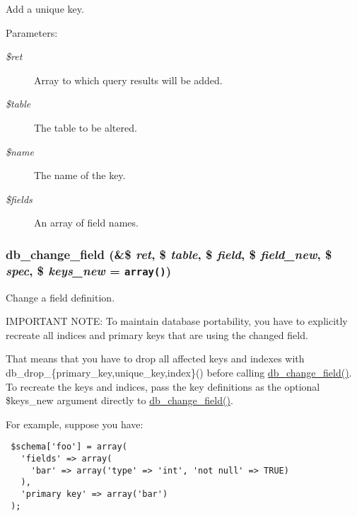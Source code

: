 Add a unique key.

\begin{Desc}
\item[Parameters:]
\begin{description}
\item[{\em \$ret}]Array to which query results will be added. \item[{\em \$table}]The table to be altered. \item[{\em \$name}]The name of the key. \item[{\em \$fields}]An array of field names. \end{description}
\end{Desc}
\hypertarget{group__schemaapi_g03f152245358d2db68d067aa8a1fceb4}{
\subsubsection[{db\_\-change\_\-field}]{\setlength{\rightskip}{0pt plus 5cm}db\_\-change\_\-field (\&\$ {\em ret}, \/  \$ {\em table}, \/  \$ {\em field}, \/  \$ {\em field\_\-new}, \/  \$ {\em spec}, \/  \$ {\em keys\_\-new} = {\tt array()})}}
\label{group__schemaapi_g03f152245358d2db68d067aa8a1fceb4}


Change a field definition.

IMPORTANT NOTE: To maintain database portability, you have to explicitly recreate all indices and primary keys that are using the changed field.

That means that you have to drop all affected keys and indexes with db\_\-drop\_\-\{primary\_\-key,unique\_\-key,index\}() before calling \hyperlink{group__schemaapi_g03f152245358d2db68d067aa8a1fceb4}{db\_\-change\_\-field()}. To recreate the keys and indices, pass the key definitions as the optional \$keys\_\-new argument directly to \hyperlink{group__schemaapi_g03f152245358d2db68d067aa8a1fceb4}{db\_\-change\_\-field()}.

For example, suppose you have: 

\begin{Code}\begin{verbatim} $schema['foo'] = array(
   'fields' => array(
     'bar' => array('type' => 'int', 'not null' => TRUE)
   ),
   'primary key' => array('bar')
 );
\end{verbatim}
\end{Code}

